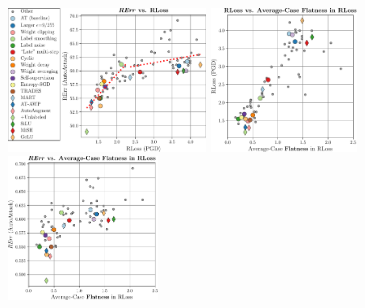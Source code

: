 \begin{figure}[t]
	\centering
	\vspace*{-0.2cm}
	\hspace*{-0.4cm}
	\begin{minipage}[t]{0.29\textwidth}
		\vspace*{0px}
		\includegraphics[height=3.8cm]{plots_main_loss_error}
	\end{minipage}
	\hspace*{2px}
	\begin{minipage}[t]{0.01\textwidth}
		\vspace*{0px}
		
		\hspace*{4px}{\color{black!75}\rule{0.65px}{3.8cm}}
	\end{minipage}
	\hspace*{2px}
	\begin{minipage}[t]{0.21\textwidth}
		\vspace*{0px}
		
		\includegraphics[height=3.8cm]{plots_main_flatness_correlation_seq_loss}
	\end{minipage}
	\hspace*{2px}
	\begin{minipage}[t]{0.21\textwidth}
		\vspace*{0px}
		
		\includegraphics[height=3.8cm]{plots_main_flatness_correlation_seq_error}
	\end{minipage}
	\hspace*{2px}
	\begin{minipage}[t]{0.01\textwidth}
		\vspace*{0px}
		

\end{minipage}
\end{figure}
